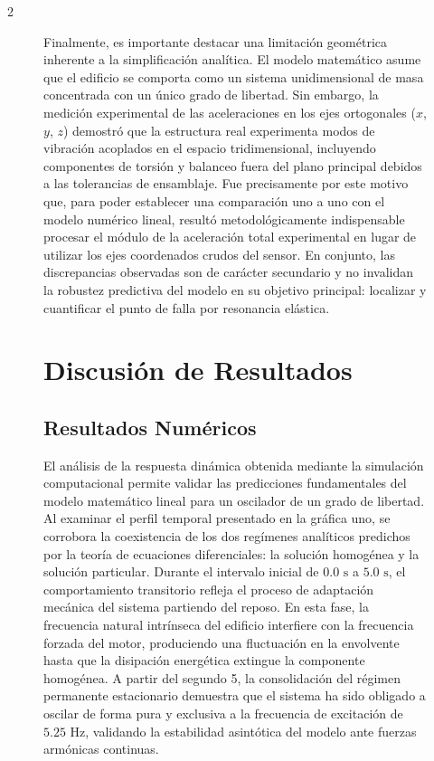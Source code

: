 \documentclass[10pt]{article}
\begin{document}
\begin{multicols}{2}
\begin{figure}[ht]
Finalmente, es importante destacar una limitación geométrica inherente a la simplificación analítica. El modelo matemático asume que el edificio se comporta como un sistema unidimensional de masa concentrada con un único grado de libertad. Sin embargo, la medición experimental de las aceleraciones en los ejes ortogonales ($x$, $y$, $z$) demostró que la estructura real experimenta modos de vibración acoplados en el espacio tridimensional, incluyendo componentes de torsión y balanceo fuera del plano principal debidos a las tolerancias de ensamblaje. Fue precisamente por este motivo que, para poder establecer una comparación uno a uno con el modelo numérico lineal, resultó metodológicamente indispensable procesar el módulo de la aceleración total experimental en lugar de utilizar los ejes coordenados crudos del sensor. En conjunto, las discrepancias observadas son de carácter secundario y no invalidan la robustez predictiva del modelo en su objetivo principal: localizar y cuantificar el punto de falla por resonancia elástica.


\section{Discusión de Resultados}
\subsection{Resultados Numéricos}

El análisis de la respuesta dinámica obtenida mediante la simulación computacional permite validar las predicciones fundamentales del modelo matemático lineal para un oscilador de un grado de libertad. Al examinar el perfil temporal presentado en la gráfica uno, se corrobora la coexistencia de los dos regímenes analíticos predichos por la teoría de ecuaciones diferenciales: la solución homogénea y la solución particular. Durante el intervalo inicial de $0.0\text{ s}$ a $5.0\text{ s}$, el comportamiento transitorio refleja el proceso de adaptación mecánica del sistema partiendo del reposo. En esta fase, la frecuencia natural intrínseca del edificio interfiere con la frecuencia forzada del motor, produciendo una fluctuación en la envolvente hasta que la disipación energética extingue la componente homogénea. A partir del segundo 5, la consolidación del régimen permanente estacionario demuestra que el sistema ha sido obligado a oscilar de forma pura y exclusiva a la frecuencia de excitación de $5.25\text{ Hz}$, validando la estabilidad asintótica del modelo ante fuerzas armónicas continuas.


\end{figure}
\end{multicols}
\end{document}
